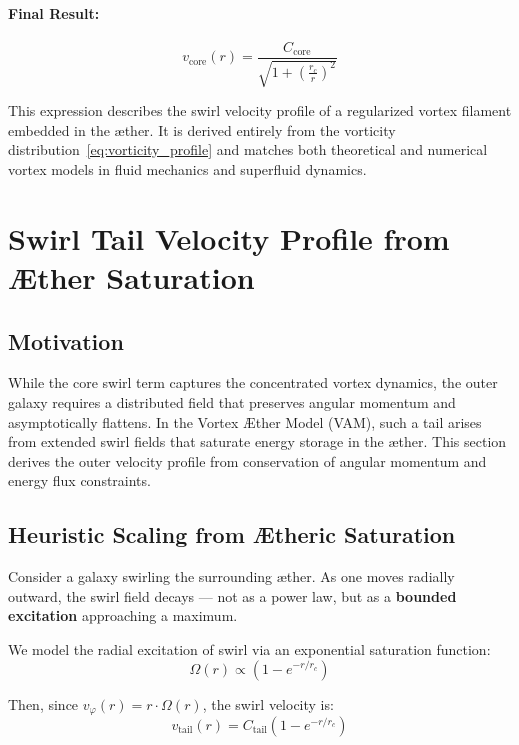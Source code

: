 \documentclass[12pt]{article}
\begin{document}
\paragraph{Final Result:}

\begin{equation}
    \boxed{
        v_\text{core}(r) = \frac{C_{\text{core}}}{\sqrt{1 + \left( \frac{r_c}{r} \right)^2 }}
    }
    \label{eq:core_velocity_final}
\end{equation}

This expression describes the swirl velocity profile of a regularized vortex filament embedded in the æther. It is derived entirely from the vorticity distribution~\eqref{eq:vorticity_profile} and matches both theoretical and numerical vortex models in fluid mechanics and superfluid dynamics.

\section{Swirl Tail Velocity Profile from Æther Saturation}
\label{appendix:swirl-tail}

\subsection{Motivation}

While the core swirl term captures the concentrated vortex dynamics, the outer galaxy requires a distributed field that preserves angular momentum and asymptotically flattens. In the Vortex \AE{}ther Model (VAM), such a tail arises from extended swirl fields that saturate energy storage in the æther. This section derives the outer velocity profile from conservation of angular momentum and energy flux constraints.

\subsection{Heuristic Scaling from Ætheric Saturation}

Consider a galaxy swirling the surrounding æther. As one moves radially outward, the swirl field decays — not as a power law, but as a \textbf{bounded excitation} approaching a maximum.

We model the radial excitation of swirl via an exponential saturation function:
\[
\Omega(r) \propto \left(1 - e^{-r/r_c} \right)
\]

Then, since \( v_\varphi(r) = r \cdot \Omega(r) \), the swirl velocity is:
\[
v_\text{tail}(r) = C_{\text{tail}} \left(1 - e^{-r/r_c} \right)
\]
\end{document}

